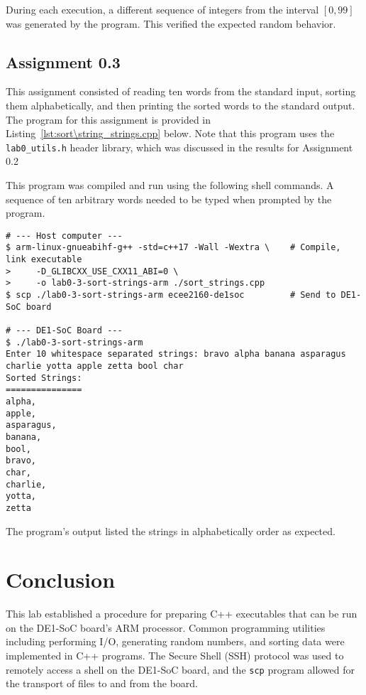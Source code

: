 \documentclass[11pt, letterpaper]{article} %
\begin{document}
During each execution, a different sequence of integers from the interval $[0,99]$ was generated by the program. This verified the expected random behavior.

\subsection*{Assignment 0.3}

This assignment consisted of reading ten words from the standard input, sorting them alphabetically, and then printing the sorted words to the standard output. The program for this assignment is provided in Listing~\ref{lst:sort\string_strings.cpp} below. Note that this program uses the \texttt{lab0\string_utils.h} header library, which was discussed in the results for Assignment 0.2


This program was compiled and run using the following shell commands. A sequence of ten arbitrary words needed to be typed when prompted by the program.

\begin{lstlisting}[style=labreportstyle-sh]
# --- Host computer ---
$ arm-linux-gnueabihf-g++ -std=c++17 -Wall -Wextra \    # Compile, link executable
>     -D_GLIBCXX_USE_CXX11_ABI=0 \
>     -o lab0-3-sort-strings-arm ./sort_strings.cpp
$ scp ./lab0-3-sort-strings-arm ecee2160-de1soc         # Send to DE1-SoC board

# --- DE1-SoC Board ---
$ ./lab0-3-sort-strings-arm
Enter 10 whitespace separated strings: bravo alpha banana asparagus charlie yotta apple zetta bool char
Sorted Strings:
===============
alpha,
apple,
asparagus,
banana,
bool,
bravo,
char,
charlie,
yotta,
zetta

\end{lstlisting}

The program's output listed the strings in alphabetically order as expected.

\section*{Conclusion}

This lab established a procedure for preparing C++ executables that can be run on the DE1-SoC board's ARM processor. Common programming utilities including performing I/O, generating random numbers, and sorting data were implemented in C++ programs. The Secure Shell (SSH) protocol was used to remotely access a shell on the DE1-SoC board, and the \texttt{scp} program allowed for the transport of files to and from the board.
\end{document}
